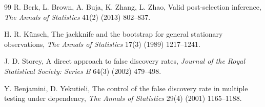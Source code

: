 \documentclass[preprint,12pt]{elsarticle}
\theoremstyle{definition}
\begin{document}
\begin{thebibliography}{99}
R. Berk, L. Brown, A. Buja, K. Zhang, L. Zhao, Valid post-selection inference,
\emph{The Annals of Statistics} 41(2) (2013) 802--837.

H. R. K\"unsch, The jackknife and the bootstrap for general stationary observations,
\emph{The Annals of Statistics} 17(3) (1989) 1217--1241.

J. D. Storey, A direct approach to false discovery rates,
\emph{Journal of the Royal Statistical Society: Series B} 64(3) (2002) 479--498.

Y. Benjamini, D. Yekutieli, The control of the false discovery rate in multiple testing under dependency,
\emph{The Annals of Statistics} 29(4) (2001) 1165--1188.

\end{thebibliography}
\end{document}
